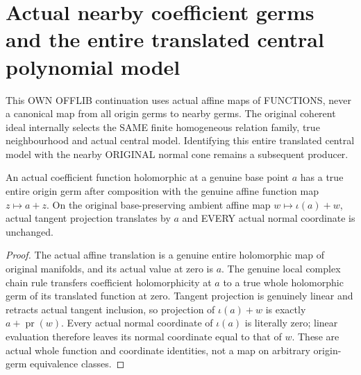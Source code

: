 \section{Actual nearby coefficient germs and the entire translated central polynomial model}
This OWN OFFLIB continuation uses actual affine maps of FUNCTIONS, never a canonical map from all origin germs to nearby germs. The original coherent ideal internally selects the SAME finite homogeneous relation family, true neighbourhood and actual central model. Identifying this entire translated central model with the nearby ORIGINAL normal cone remains a subsequent producer.

\begin{lemma}
\label{hir:relative-normal-nearby-actual-function-coefficient-germs}
\leanok
An actual coefficient function holomorphic at a genuine base point $a$ has a true entire origin germ after composition with the genuine affine function map $z\mapsto a+z$. On the original base-preserving ambient affine map $w\mapsto \iota(a)+w$, actual tangent projection translates by $a$ and EVERY actual normal coordinate is unchanged.
\end{lemma}
\begin{proof}
The actual affine translation is a genuine entire holomorphic map of original manifolds, and its actual value at zero is $a$. The genuine local complex chain rule transfers coefficient holomorphicity at $a$ to a true whole holomorphic germ of its translated function at zero. Tangent projection is genuinely linear and retracts actual tangent inclusion, so projection of $\iota(a)+w$ is exactly $a+\operatorname{pr}(w)$. Every actual normal coordinate of $\iota(a)$ is literally zero; linear evaluation therefore leaves its normal coordinate equal to that of $w$. These are actual whole function and coordinate identities, not a map on arbitrary origin-germ equivalence classes.
\end{proof}

